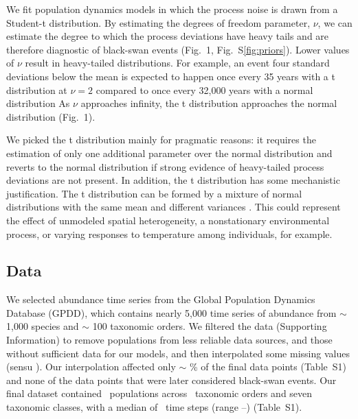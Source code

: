 We fit population dynamics models in which the process noise is
drawn from a Student-t distribution. By estimating the degrees of freedom
parameter, \(\nu\), we can estimate the degree to which the process deviations
have heavy tails and are therefore diagnostic of black-swan events (Fig.~1,
Fig.~S\ref{fig:priors}). Lower values of \(\nu\) result in heavy-tailed
distributions.
For example, an event four standard deviations below the mean
is expected to happen once every 35 years with a t distribution at \(\nu = 2\)
compared to once every 32,000 years with a normal distribution
As \(\nu\) approaches infinity, the t
distribution approaches the normal distribution (Fig.~1).

We picked the t distribution mainly for pragmatic reasons:
it requires the estimation of only one additional
parameter over the normal distribution and reverts to the normal distribution
if strong evidence of heavy-tailed process deviations are not present.
In addition, the t distribution has some mechanistic justification.
The t distribution can be formed by a mixture of normal distributions
with the same mean and different variances \citep{gelman2014}.
This could represent the effect of unmodeled spatial heterogeneity,
a nonstationary environmental process, or
varying responses to temperature among individuals,
for example.

\subsection{Data}

We selected abundance time series from the Global Population Dynamics
Database \citep{gpdd2010} (GPDD), which contains nearly 5,000 time series of
abundance from \(\sim\) 1,000 species and \(\sim\) 100 taxonomic orders. We
filtered the data (Supporting Information) to remove populations from less
reliable data sources, and those without sufficient data for our models, and
then interpolated some missing values (sensu \citet{brook2006a}). Our interpolation affected only \(\sim\)
\interpPointsPerc \% of the final data points (Table~S1) and none of the data
points that were later considered black-swan events. Our final dataset
contained \NPops\ populations across \NOrders\ taxonomic orders and seven
taxonomic classes, with a median of \medianTimeSteps\ time steps (range
\minTimeSteps--\maxTimeSteps) (Table~S1).

